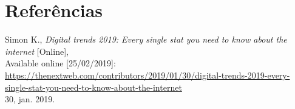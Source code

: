 \section{Referências}
\begingroup
\renewcommand{\section}[2]{}
\begin{thebibliography}{9}

    \vspace{-0.2cm}

    Simon K.,
    \textit{Digital trends 2019: Every single stat you need to know about the internet} [Online], \\
    Available online [25/02/2019]: \url{https://thenextweb.com/contributors/2019/01/30/digital-trends-2019-every-single-stat-you-need-to-know-about-the-internet} \\
    30, jan. 2019.\\

    \vspace{-0.5cm}

\end{thebibliography}
\endgroup

\vspace{-0.3cm}
